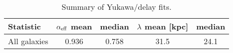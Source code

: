 \begin{table}[t]\centering\small
\begin{tabular}{lcccc}
\toprule
Statistic & $\alpha_{\rm eff}$ mean & median & $\lambda$ mean [kpc] & median \\
\midrule
All galaxies & 0.936 & 0.758 & 31.5 & 24.1 \\
\bottomrule
\end{tabular}
\caption{Summary of Yukawa/delay fits.}
\end{table}

